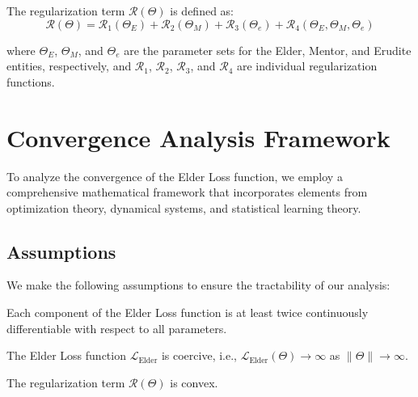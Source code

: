 \begin{definition}
The regularization term $\mathcal{R}(\Theta)$ is defined as:
\begin{equation}
\mathcal{R}(\Theta) = \mathcal{R}_1(\Theta_E) + \mathcal{R}_2(\Theta_M) + \mathcal{R}_3(\Theta_e) + \mathcal{R}_4(\Theta_E, \Theta_M, \Theta_e)
\end{equation}

where $\Theta_E$, $\Theta_M$, and $\Theta_e$ are the parameter sets for the Elder, Mentor, and Erudite entities, respectively, and $\mathcal{R}_1$, $\mathcal{R}_2$, $\mathcal{R}_3$, and $\mathcal{R}_4$ are individual regularization functions.
\end{definition}

\section{Convergence Analysis Framework}

To analyze the convergence of the Elder Loss function, we employ a comprehensive mathematical framework that incorporates elements from optimization theory, dynamical systems, and statistical learning theory.

\subsection{Assumptions}

We make the following assumptions to ensure the tractability of our analysis:

\begin{assumption}[Smoothness]
Each component of the Elder Loss function is at least twice continuously differentiable with respect to all parameters.
\end{assumption}

\begin{assumption}[Coercivity]
The Elder Loss function $\mathcal{L}_{\text{Elder}}$ is coercive, i.e., $\mathcal{L}_{\text{Elder}}(\Theta) \to \infty$ as $\|\Theta\| \to \infty$.
\end{assumption}

\begin{assumption}
The regularization term $\mathcal{R}(\Theta)$ is convex.
\end{assumption}

